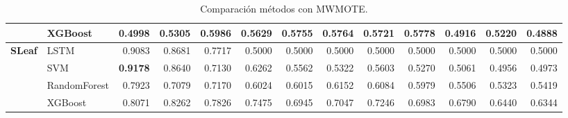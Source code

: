 \begin{table}[h]
\begin{adjustbox}{max width=15cm}
\begin{tabular}{|c|l|r|r|r|r|r|r|r|r|r|r|r|}
		& XGBoost &  0.4998 &  0.5305 &  0.5986 &  0.5629 &  0.5755 &  0.5764 &  0.5721 &  0.5778 &  0.4916 &  0.5220 &  0.4888 \\
		\hline
		\textbf{SLeaf} & LSTM &  0.9083 &  0.8681 &  0.7717 &  0.5000 &  0.5000 &  0.5000 &  0.5000 &  0.5000 &  0.5000 &  0.5000 &  0.5000 \\
		& SVM &  \textbf{0.9178} &  0.8640 &  0.7130 &  0.6262 &  0.5562 &  0.5322 &  0.5603 &  0.5270 &  0.5061 &  0.4956 &  0.4973 \\
		& RandomForest &  0.7923 &  0.7079 &  0.7170 &  0.6024 &  0.6015 &  0.6152 &  0.6084 &  0.5979 &  0.5506 &  0.5323 &  0.5419 \\
		& XGBoost &  0.8071 &  0.8262 &  0.7826 &  0.7475 &  0.6945 &  0.7047 &  0.7246 &  0.6983 &  0.6790 &  0.6440 &  0.6344 \\
		\hline
\end{tabular}
\end{adjustbox}
\caption{Comparación métodos con MWMOTE.}
\label{tab:all_comp_mwmote}
\end{table}


